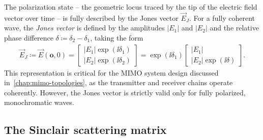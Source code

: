 The polarization state -- the geometric locus traced by the tip of the electric field vector over time -- is fully described by the Jones vector $\vec E_J$.
For a fully coherent wave, the \emph{Jones vector} is defined by the amplitudes $|E_1|$ and $|E_2|$ and the relative phase difference $\delta \coloneq \delta_2 - \delta_1$, taking the form
\begin{align}
    \label{eq:jones-vector}
    \vec E_J \coloneq \vec E(\mathbf o,0) = \begin{bmatrix} |E_1| \exp(\ii\delta_1) \\ |E_2| \exp(\ii\delta_2) \end{bmatrix} = \exp(\ii\delta_1) \begin{bmatrix} |E_1| \\ |E_2| \exp(\ii\delta) \end{bmatrix}.
\end{align}
This representation is critical for the MIMO system design discussed in~\cref{chap:mimo-topologies}, as the transmitter and receiver chains operate coherently.
However, the Jones vector is strictly valid only for fully polarized, monochromatic waves.


\subsection{The Sinclair scattering matrix}
\label{sec:sinclair-matrix}

